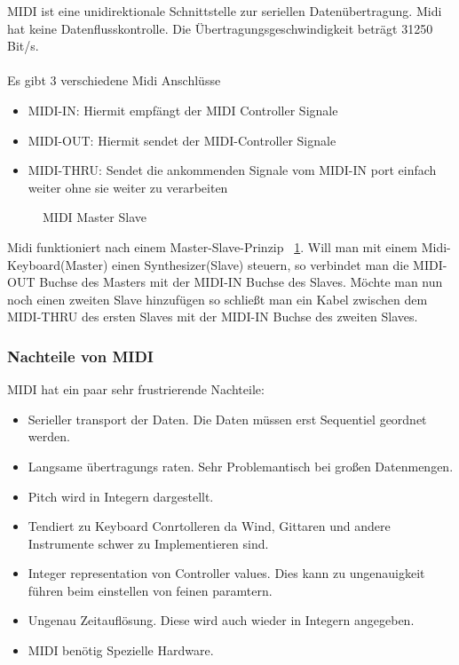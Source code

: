 \documentclass[a4paper, 12pt]{article}
\begin{document}
MIDI ist eine unidirektionale Schnittstelle zur seriellen Datenübertragung. Midi hat keine Datenflusskontrolle. Die Übertragungsgeschwindigkeit beträgt 31250 Bit/s. \cite{MIDI} \\
\\
Es gibt 3 verschiedene Midi Anschlüsse 
\begin{itemize}
  \item MIDI-IN: Hiermit empfängt der MIDI Controller Signale
  \item MIDI-OUT: Hiermit sendet der MIDI-Controller Signale
  \item MIDI-THRU: Sendet die ankommenden Signale vom MIDI-IN port einfach weiter ohne sie weiter zu verarbeiten
\end{itemize}
 \begin{figure}[htbp]
  \centering
  \caption[MIDI Master Slave \cite{MMS}]{MIDI Master Slave} 
  \label{fig:mms}
\end{figure}
Midi funktioniert nach einem Master-Slave-Prinzip ~\ref{fig:mms}.
Will man mit einem Midi-Keyboard(Master) einen Synthesizer(Slave) steuern, so verbindet man die MIDI-OUT Buchse des Masters mit der MIDI-IN Buchse des Slaves. Möchte man nun noch einen zweiten Slave hinzufügen so schließt man ein Kabel zwischen dem MIDI-THRU des ersten Slaves mit der MIDI-IN Buchse des zweiten Slaves.

\subsubsection{Nachteile von MIDI}
MIDI hat ein paar sehr frustrierende Nachteile:
\begin{itemize}
  \item Serieller transport der Daten. Die Daten müssen erst Sequentiel geordnet werden.
  \item Langsame übertragungs raten. Sehr Problemantisch bei großen Datenmengen.
  \item Pitch wird in Integern dargestellt.
  \item Tendiert zu Keyboard Conrtolleren da Wind, Gittaren und andere Instrumente schwer zu Implementieren sind.
  \item Integer representation von Controller values. Dies kann zu ungenauigkeit führen beim einstellen von feinen paramtern.
  \item Ungenau Zeitauflösung. Diese wird auch wieder in Integern angegeben.
  \item MIDI benötig Spezielle Hardware. 
\end{itemize}
\end{document}
